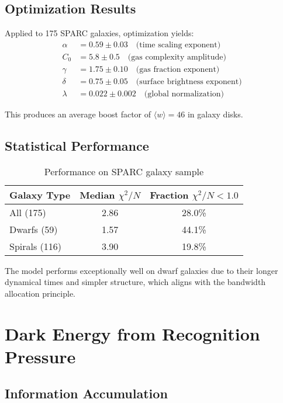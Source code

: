 \documentclass[12pt]{article}
\begin{document}
\subsection{Optimization Results}

Applied to 175 SPARC galaxies, optimization yields:
\begin{align}
\alpha &= 0.59 \pm 0.03 \quad \text{(time scaling exponent)}\\
C_0 &= 5.8 \pm 0.5 \quad \text{(gas complexity amplitude)}\\
\gamma &= 1.75 \pm 0.10 \quad \text{(gas fraction exponent)}\\
\delta &= 0.75 \pm 0.05 \quad \text{(surface brightness exponent)}\\
\lambda &= 0.022 \pm 0.002 \quad \text{(global normalization)}
\end{align}

This produces an average boost factor of $\langle w \rangle = 46$ in galaxy disks.

\subsection{Statistical Performance}

\begin{table}[h]
\centering
\begin{tabular}{|l|c|c|}
\hline
Galaxy Type & Median $\chi^2/N$ & Fraction $\chi^2/N < 1.0$ \\
\hline
All (175) & 2.86 & 28.0\% \\
Dwarfs (59) & 1.57 & 44.1\% \\
Spirals (116) & 3.90 & 19.8\% \\
\hline
\end{tabular}
\caption{Performance on SPARC galaxy sample}
\end{table}

The model performs exceptionally well on dwarf galaxies due to their longer dynamical times and simpler structure, which aligns with the bandwidth allocation principle.

\section{Dark Energy from Recognition Pressure}

\subsection{Information Accumulation}
\end{document}
